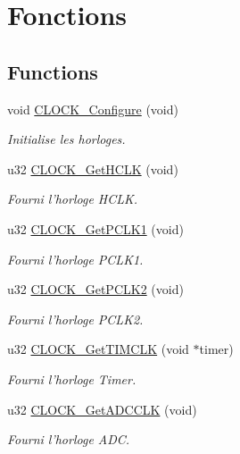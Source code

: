 \hypertarget{group___c_l_o_c_k__fonctions}{\section{Fonctions}
\label{group___c_l_o_c_k__fonctions}
}
\subsection*{Functions}
\begin{DoxyCompactItemize}
\item 
void \hyperlink{group___c_l_o_c_k__fonctions_ga955f31a13011ed29d9bc0050eaba9ab4}{C\+L\+O\+C\+K\+\_\+\+Configure} (void)
\begin{DoxyCompactList}\small\item\em Initialise les horloges. \end{DoxyCompactList}\item 
u32 \hyperlink{group___c_l_o_c_k__fonctions_gaad3b9e53bdbf363ff2d8079afd54e4c7}{C\+L\+O\+C\+K\+\_\+\+Get\+H\+C\+L\+K} (void)
\begin{DoxyCompactList}\small\item\em Fourni l'horloge H\+C\+L\+K. \end{DoxyCompactList}\item 
u32 \hyperlink{group___c_l_o_c_k__fonctions_gab3e649f8825a3738fbffde390aecece2}{C\+L\+O\+C\+K\+\_\+\+Get\+P\+C\+L\+K1} (void)
\begin{DoxyCompactList}\small\item\em Fourni l'horloge P\+C\+L\+K1. \end{DoxyCompactList}\item 
u32 \hyperlink{group___c_l_o_c_k__fonctions_gaf75d59f7bf532086205a478d4ab414a1}{C\+L\+O\+C\+K\+\_\+\+Get\+P\+C\+L\+K2} (void)
\begin{DoxyCompactList}\small\item\em Fourni l'horloge P\+C\+L\+K2. \end{DoxyCompactList}\item 
u32 \hyperlink{group___c_l_o_c_k__fonctions_ga0518e4a9cf60eff33ff185bc46dc1963}{C\+L\+O\+C\+K\+\_\+\+Get\+T\+I\+M\+C\+L\+K} (void $\ast$timer)
\begin{DoxyCompactList}\small\item\em Fourni l'horloge Timer. \end{DoxyCompactList}\item 
u32 \hyperlink{group___c_l_o_c_k__fonctions_ga4197af9a5574e36f76d5d5afa274b054}{C\+L\+O\+C\+K\+\_\+\+Get\+A\+D\+C\+C\+L\+K} (void)
\begin{DoxyCompactList}\small\item\em Fourni l'horloge A\+D\+C. \end{DoxyCompactList}\end{DoxyCompactItemize}


